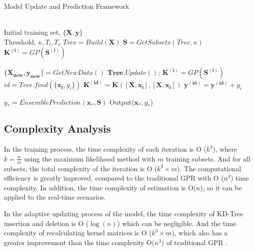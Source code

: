 \documentclass[twoside,leqno,twocolumn]{article}
\begin{document}
\begin{algorithm}[htb]
\caption{Model Update and Prediction Framework} \label{alg:MCT}
\begin{algorithmic}[1]
\REQUIRE ~~\\
Initial training set, $\{\bm{X}, \bm{y}\}$\\
Threshold, $\kappa, T_l, T_s$
\STATE $Tree= Build(\bm{X})$
\STATE $\bm{S} = GetSubsets(Tree, \kappa)$
   \STATE $\bm{K^{(i)}}=GP(\bm{S^{(i)}})$
\ENDFOR

    \STATE $\{\bm{X_{new}}, \bm{y_{new}}\}=GetNewData()$
        \STATE $\bm{Tree}.Update()$;
              \STATE $\bm{K^{(i)}}=GP(\bm{S^{(i)}})$
        \ENDFOR
     \ELSE
           \STATE $id = Tree.find(\{\bm{x_i}, y_i\})$
           \STATE $\bm{K^{(id)}} = \bm{K}([\bm{X}, \bm{x_{i}}], [\bm{X}, \bm{x_{i}}])$
            \STATE $\bm{y^{(id)}}=\bm{y^{(id)}} + y_i$
         \ENDFOR
      \ENDIF

       \STATE $y_* = EnsemblePrediction(\bm{x_*}, \bm{S})$
       \STATE Output(${\bm{x_*}, y_*}$)
    \ENDFOR
\ENDWHILE

\end{algorithmic}
\end{algorithm}


\subsection{Complexity Analysis}
In the training process, the time complexity of each iteration is O ($k^3$), where $k=\frac{n}m$ using the maximum likelihood method with $m$ training subsets. And for all subsets, the total complexity of the iteration is O ($k^3\times m$).  The computational efficiency is greatly improved, compared to the traditional GPR with O ($n^3$) time complexity. In addition, the time complexity of estimation is O($n$), so it can be applied to the real-time scenarios.

In the adaptive updating process of the model, the time complexity of KD-Tree insertion and deletion is O ($\log (n) $) which can be negligible. And the time complexity of recalculating kernel matrices is O ($k^3\times m$), which also has a greater improvement than the time complexity O($n^3$) of traditional GPR .
\end{document}
